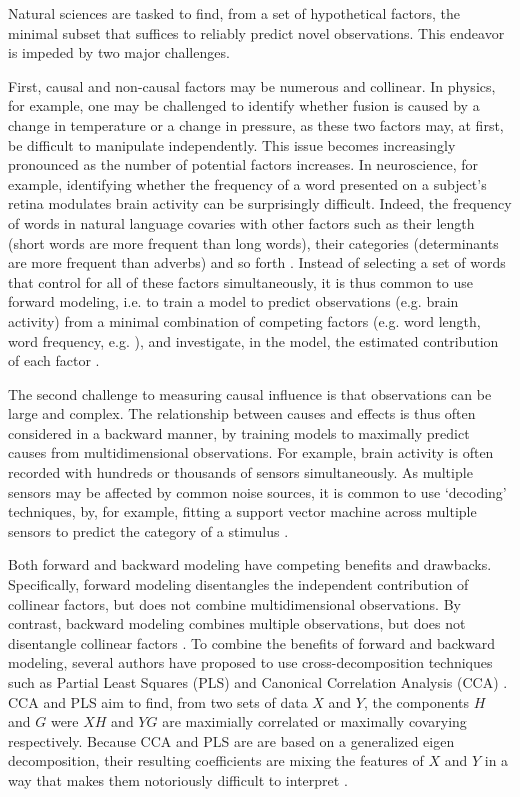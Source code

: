 Natural sciences are tasked to find, from a set of hypothetical factors, the minimal subset that suffices to reliably predict novel observations. This endeavor is impeded by two major challenges.

First, causal and non-causal factors may be numerous and collinear. In physics, for example, one may be challenged to identify whether fusion is caused by a change in temperature or a change in pressure, as these two factors may, at first, be difficult to manipulate independently. This issue becomes increasingly pronounced as the number of potential factors increases. In neuroscience, for example, identifying whether the frequency of a word presented on a subject's retina modulates brain activity can be surprisingly difficult. Indeed, the frequency of words in natural language covaries with other factors such as their length (short words are more frequent than long words), their categories (determinants are more frequent than adverbs) and so forth \citep{kutas2011thirty,pegado2014timing}. Instead of selecting a set of words that control for all of these factors simultaneously, it is thus common to use forward modeling, i.e. to train a model to predict observations (e.g. brain activity) from a minimal combination of competing factors (e.g. word length, word frequency, e.g. \citep{huth2016natural}), and investigate, in the model, the estimated contribution of each factor \citep{friston1994statistical}.

The second challenge to measuring causal influence is that observations can be large and complex. The relationship between causes and effects is thus often considered in a backward manner, by training models to maximally predict causes from multidimensional observations. For example, brain activity is often recorded with hundreds or thousands of sensors simultaneously. As multiple sensors may be affected by common noise sources, it is common to use `decoding' techniques, by, for example, fitting a support vector machine across multiple sensors to predict the category of a stimulus \citep{cichy2014resolving,  kriegeskorte2008representational, norman2006beyond}.

Both forward and backward modeling have competing benefits and drawbacks. Specifically, forward modeling disentangles the independent contribution of collinear factors, but does not combine multidimensional observations. By contrast, backward modeling combines multiple observations, but does not disentangle collinear factors \cite{weichwald2015causal, hebart2018deconstructing, king2018encoding}. To combine the benefits of forward and backward modeling, several authors have proposed to use cross-decomposition techniques such as Partial Least Squares (PLS) and Canonical Correlation Analysis (CCA) \citep{de2019multiway}.
CCA and PLS aim to find, from two sets of data $X$ and $Y$, the components $H$ and $G$ were $XH$ and $YG$ are maximially correlated or maximally covarying respectively. Because CCA and PLS are are based on a generalized eigen decomposition, their resulting coefficients are mixing the features of $X$ and $Y$ in a way that makes them notoriously difficult to interpret \citep{lebart1995statistique}.

